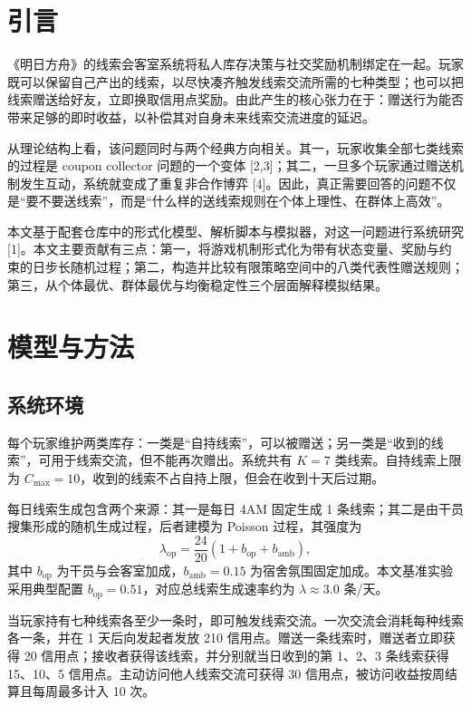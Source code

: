 \documentclass{rubbish}
\begin{document}
\begin{rubbishbody}

\section{引言}

《明日方舟》的线索会客室系统将私人库存决策与社交奖励机制绑定在一起。玩家既可以保留自己产出的线索，以尽快凑齐触发线索交流所需的七种类型；也可以把线索赠送给好友，立即换取信用点奖励。由此产生的核心张力在于：赠送行为能否带来足够的即时收益，以补偿其对自身未来线索交流进度的延迟。

从理论结构上看，该问题同时与两个经典方向相关。其一，玩家收集全部七类线索的过程是 coupon collector 问题的一个变体 [2,3]；其二，一旦多个玩家通过赠送机制发生互动，系统就变成了重复非合作博弈 [4]。因此，真正需要回答的问题不仅是“要不要送线索”，而是“什么样的送线索规则在个体上理性、在群体上高效”。

本文基于配套仓库中的形式化模型、解析脚本与模拟器，对这一问题进行系统研究 [1]。本文主要贡献有三点：第一，将游戏机制形式化为带有状态变量、奖励与约束的日步长随机过程；第二，构造并比较有限策略空间中的八类代表性赠送规则；第三，从个体最优、群体最优与均衡稳定性三个层面解释模拟结果。

\section{模型与方法}

\subsection{系统环境}

每个玩家维护两类库存：一类是“自持线索”，可以被赠送；另一类是“收到的线索”，可用于线索交流，但不能再次赠出。系统共有 $K=7$ 类线索。自持线索上限为 $C_{\max}=10$，收到的线索不占自持上限，但会在收到十天后过期。

每日线索生成包含两个来源：其一是每日 4AM 固定生成 1 条线索；其二是由干员搜集形成的随机生成过程，后者建模为 Poisson 过程，其强度为
\begin{equation}
\lambda_{\mathrm{op}} = \frac{24}{20}\left(1+b_{\mathrm{op}}+b_{\mathrm{amb}}\right),
\end{equation}
其中 $b_{\mathrm{op}}$ 为干员与会客室加成，$b_{\mathrm{amb}}=0.15$ 为宿舍氛围固定加成。本文基准实验采用典型配置 $b_{\mathrm{op}}=0.51$，对应总线索生成速率约为 $\lambda \approx 3.0$ 条/天。

当玩家持有七种线索各至少一条时，即可触发线索交流。一次交流会消耗每种线索各一条，并在 1 天后向发起者发放 210 信用点。赠送一条线索时，赠送者立即获得 20 信用点；接收者获得该线索，并分别就当日收到的第 1、2、3 条线索获得 15、10、5 信用点。主动访问他人线索交流可获得 30 信用点，被访问收益按周结算且每周最多计入 10 次。


\end{rubbishbody}
\end{document}
